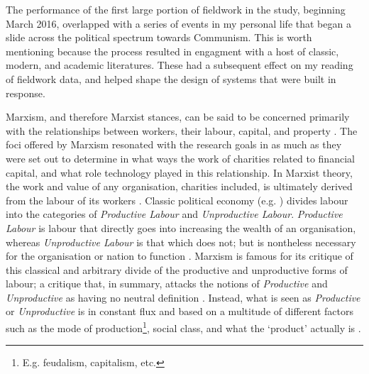 The performance of the first large portion of fieldwork in the study, beginning March 2016, overlapped with a series of events in my personal life that began a slide across the political spectrum towards Communism. This is worth mentioning because the process resulted in engagment with a host of classic, modern, and academic literatures. These had a subsequent effect on my reading of fieldwork data, and helped shape the design of systems that were built in response.


Marxism, and therefore Marxist stances, can be said to be concerned primarily with the relationships between workers, their labour, capital, and property . The foci offered by Marxism resonated with the research goals in as much as they were set out to determine in what ways the work of charities related to financial capital, and what role technology played in this relationship. In Marxist theory, the work and value of any organisation, charities included, is ultimately derived from the labour of its workers \cite{marx_contribution_1970}. Classic political economy (e.g. \cite{smith_inquiry_1785}) divides labour into the categories of \textit{Productive Labour} and \textit{Unproductive Labour}. \textit{Productive Labour} is labour that directly goes into increasing the wealth of an organisation, whereas \textit{Unproductive Labour} is that which does not; but is nontheless necessary for the organisation or nation to function \cite{smith_inquiry_1785}. Marxism is famous for its critique of this classical and arbitrary divide of the productive and unproductive forms of labour; a critique that, in summary, attacks the notions of \textit{Productive} and \textit{Unproductive} as having no neutral definition \cite{marx_capital_1974}. Instead, what is seen as \textit{Productive} or \textit{Unproductive} is in constant flux and based on a multitude of different factors such as the mode of production\footnote{E.g. feudalism, capitalism, etc.}, social class, and what the `product' actually is \cite{marx_capital_1974}.




